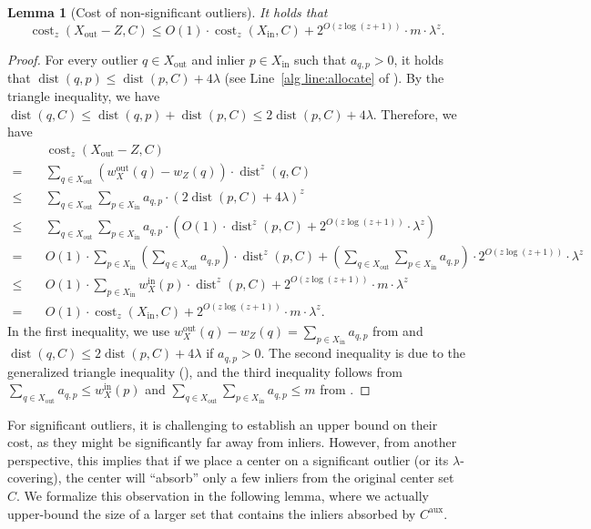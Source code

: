 \documentclass[letterpaper,11pt]{article}
\theoremstyle{plain}
\newtheorem{lemma}[theorem]{Lemma}
\theoremstyle{definition}
\theoremstyle{remark}
\DeclareMathOperator{\cost}{cost}
\DeclareMathOperator{\dist}{dist}
\newcommand{\inl}{\mathrm{in}}
\newcommand{\out}{\mathrm{out}}
\newcommand{\aux}{\mathrm{aux}}
\begin{document}
\begin{lemma}[Cost of non-significant outliers]
    \label{lem:for non-significant}
    It holds that
    \begin{equation*}
        \cost_z(X_\out - Z,C)\le O(1)\cdot \cost_z(X_\inl,C) + 2^{O(z\log(z+1))}\cdot m\cdot \lambda^z.
    \end{equation*}
\end{lemma}
\begin{proof}
    For every outlier $q\in X_\out$ and inlier $p\in X_\inl$ such that $a_{q,p}>0$, it holds that $\dist(q,p)\le \dist(p,C) + 4\lambda$ (see Line~\ref{alg line:allocate} of ). By the triangle inequality, we have $\dist(q,C)\le \dist(q,p) + \dist(p,C) \le 2\dist(p,C) + 4\lambda$. 
    Therefore, we have 
    \begin{align*}
        &\quad \cost_z(X_\out - Z,C)\quad\\
        =&\quad \sum_{q\in X_\out} \left(w_X^\out(q) - w_Z(q) \right)\cdot \dist^z(q,C)\\
        \le&\quad \sum_{q\in X_\out}\sum_{p\in X_\inl}a_{q,p}\cdot\left(2\dist(p,C) + 4\lambda \right)^z\\
        \le&\quad \sum_{q\in X_\out}\sum_{p\in X_\inl}a_{q,p}\cdot\left(O(1)\cdot \dist^z(p,C) + 2^{O(z\log(z+1))}\cdot \lambda^z \right)\\
        =&\quad O(1)\cdot \sum_{p\in X_\inl}\left(\sum_{q\in X_\out} a_{q,p} \right)\cdot \dist^z(p,C) + \left(\sum_{q\in X_\out}\sum_{p\in X_\inl}a_{q,p} \right)\cdot 2^{O(z\log(z+1))}\cdot \lambda^z\\
        \le&\quad O(1)\cdot \sum_{p\in X_\inl} w_X^\inl(p)\cdot \dist^z(p,C) + 2^{O(z\log(z+1))}\cdot m\cdot \lambda^z\\
        =&\quad O(1)\cdot \cost_z(X_\inl,C) + 2^{O(z\log(z+1))}\cdot m\cdot \lambda^z.
    \end{align*} 
    In the first inequality, we use $w_X^\out(q) - w_Z(q) = \sum_{p \in X_\inl} a_{q,p}$ from  and $\dist(q,C)\le 2\dist(p,C)+4\lambda$ if $a_{q,p}>0$. The second inequality is due to the generalized triangle inequality (), and the third inequality follows from $\sum_{q \in X_\out} a_{q,p} \le w_X^\inl(p)$ and $\sum_{q \in X_\out} \sum_{p \in X_\inl} a_{q,p} \le m$ from .
\end{proof}

For significant outliers, it is challenging to establish an upper bound on their cost, as they might be significantly far away from inliers. However, from another perspective, this implies that if we place a center on a significant outlier (or its $\lambda$-covering), the center will ``absorb'' only a few inliers from the original center set $C$. We formalize this observation in the following lemma, where we actually upper-bound the size of a larger set that contains the inliers absorbed by $C^\aux$.
\end{document}
